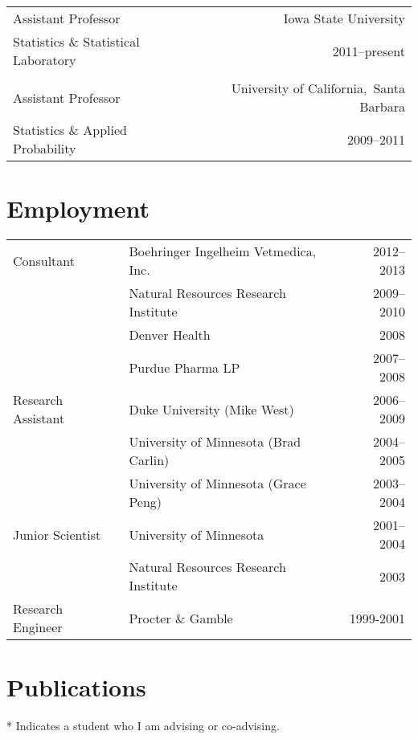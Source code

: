\documentclass[overlapped,line]{res}
\begin{document}
\begin{resume}
\begin{tabular}{l@{\qquad}r}
Assistant Professor & Iowa State University \\
Statistics \& Statistical Laboratory & 2011--present \\
\\
Assistant Professor & University of California,\ Santa Barbara \\
Statistics \& Applied Probability & 2009--2011
\end{tabular}


\section{\bf Employment}

\begin{tabular}{l@{\qquad}l@{\qquad}r}
Consultant & Boehringer Ingelheim Vetmedica, Inc. & 2012--2013 \\
 & Natural Resources Research Institute  & 2009--2010 \\
 & Denver Health & 2008 \\
 & Purdue Pharma LP & 2007--2008 \\
Research Assistant & Duke University (Mike West) & 2006--2009 \\
 & University of Minnesota (Brad Carlin) & 2004--2005 \\
 & University of Minnesota (Grace Peng) & 2003--2004 \\
Junior Scientist & University of Minnesota & 2001--2004 \\
 & Natural Resources Research Institute & 2003 \\
Research Engineer & Procter \& Gamble & 1999-2001
\end{tabular}


\section{Publications}

* Indicates a student who I am advising or co-advising.

\vspace{-0.3in}




\end{resume}
\end{document}
